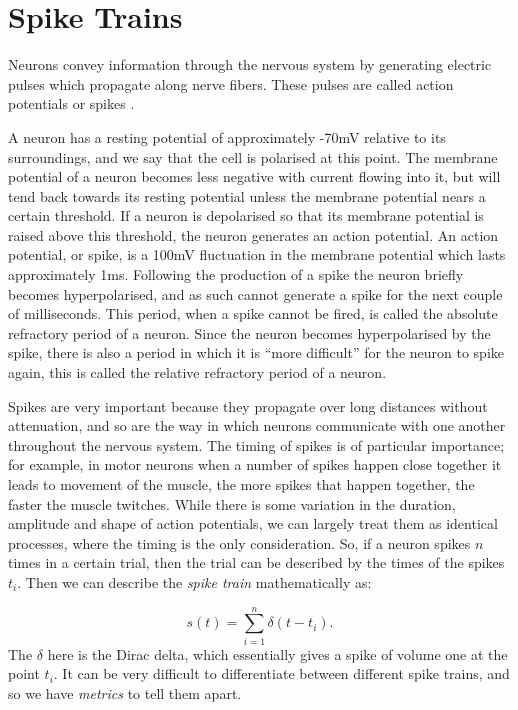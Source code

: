 
\section{Spike Trains}

Neurons convey information through the nervous system by generating
electric pulses which propagate along nerve fibers.  These pulses are
called action potentials or spikes \cite{DayanAbbott2001a}. 

A neuron has a resting potential of approximately -70mV relative to
its surroundings, and we say that the cell is polarised at this point.
The membrane potential of a neuron becomes less negative with current
flowing into it, but will tend back towards its resting potential
unless the membrane potential nears a certain threshold. If a neuron
is depolarised so that its membrane potential is raised above this
threshold, the neuron generates an action potential. An action potential, or 
spike, is a 100mV fluctuation in the membrane potential which lasts 
approximately 1ms. Following the production of a spike the neuron briefly 
becomes hyperpolarised, and as such cannot generate a spike for the next
couple of milliseconds.  This period, when a spike cannot be fired, is
called the absolute refractory period of a neuron.  Since the neuron
becomes hyperpolarised by the spike, there is also a period in which
it is ``more difficult'' for the neuron to spike again, this is called
the relative refractory period of a neuron. 

Spikes are very important because they propagate over long distances without 
attenuation, and so are the way in which neurons communicate with one another 
throughout the nervous system.  The timing of spikes is of particular 
importance; for example, in motor neurons when a number of spikes happen close 
together it leads to movement of the muscle, the more spikes that happen 
together, the faster the muscle twitches.  While there is some variation in 
the duration, amplitude and shape of action potentials, we can largely treat 
them as identical processes, where the timing is the only consideration.  So, 
if a neuron spikes $n$ times in a certain trial, then the trial can be 
described by the times of the spikes $t_i$.  Then we can describe the 
{\sl spike train} mathematically as:

\begin{equation}
s(t) = \sum_{i=1}^n \delta(t-t_i).
\end{equation}
The $\delta$ here is the Dirac delta, which essentially gives a spike of volume 
one at the point $t_i$. It can be very difficult to differentiate between 
different spike trains, and so we have {\sl metrics} to tell them apart.

